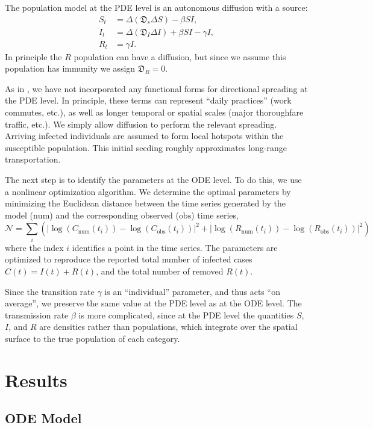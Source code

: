 \documentclass[11pt]{article}
\newcommand{\N}{\mathcal{N}}
\newcommand{\num}{\text{num}}
\newcommand{\obs}{\text{obs}}
\newcommand{\D}{\mathfrak{D}}
\begin{document}
The population model at the PDE level is an autonomous diffusion with a source:
\begin{align}
	S_t	&=	\Delta (\D_s \Delta S) - \beta SI,	\\
	I_t	&=	\Delta (\D_I \Delta I) + \beta SI - \gamma I,	\\
	R_t	&=	\gamma I.
\end{align}
In principle the $R$ population can have a diffusion, but since we assume this population has immunity we assign $\D_R = 0$.

As in \cite{Kevrekidis_2021}, we have not incorporated any functional forms for directional spreading at the PDE level.
In principle, these terms can represent ``daily practices'' (work commutes, etc.), as well as longer temporal or spatial scales (major thoroughfare traffic, etc.).
We simply allow diffusion to perform the relevant spreading.
Arriving infected individuals are assumed to form local hotspots within the susceptible population.
This initial seeding roughly approximates long-range transportation.

The next step is to identify the parameters at the ODE level.
To do this, we use a nonlinear optimization algorithm.
We determine the optimal parameters by minimizing the Euclidean distance between the time series generated by the model ($\num$) and the corresponding observed ($\obs$) time series,
\begin{equation}
	\N = \sum_i \left( \left| \log(C_\num (t_i)) - \log(C_\obs (t_i)) \right|^2 + \left| \log(R_\num (t_i)) - \log(R_\obs (t_i)) \right|^2 \right)
\end{equation}
where the index $i$ identifies a point in the time series.
The parameters are optimized to reproduce the reported total number of infected cases $C(t) = I(t) + R(t)$, and the total number of removed $R(t)$.

Since the transition rate $\gamma$ is an ``individual'' parameter, and thus acts ``on average'', we preserve the same value at the PDE level as at the ODE level.
The transmission rate $\beta$ is more complicated, since at the PDE level the quantities $S$, $I$, and $R$ are densities rather than populations,
which integrate over the spatial surface to the true population of each category.

\section{Results}
\subsection{ODE Model}
\end{document}
